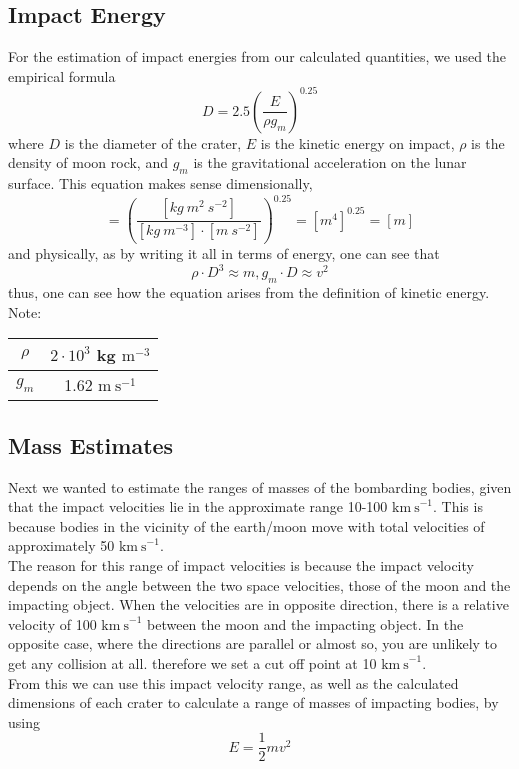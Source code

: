 \documentclass{article}
\begin{document}
\subsection{Impact Energy}
For the estimation of impact energies from our calculated quantities, we used the empirical formula
\begin{equation}
D=2.5\left(\frac{E}{\rho g_m}\right)^{0.25}
\label{eq: kinEdiamrel}
\end{equation}
where $D$ is the diameter of the crater, $E$ is the kinetic energy on impact, $\rho$ is the density of moon rock, and $g_m$ is the gravitational acceleration on the lunar surface. This equation makes sense dimensionally,
\begin{equation}
[m]=\left(\frac{[kg ~m^2 ~s^{-2}]}{[kg~ m^{-3}]\cdot [m ~s^{-2}]}\right)^{0.25}=[m^4]^{0.25}=[m]
\end{equation}
and physically, as by writing it all in terms of energy, one can see that
\begin{equation}
\rho \cdot D^3 \approx m, g_m\cdot D \approx v^2 
\end{equation}
thus, one can see how the equation arises from the definition of kinetic energy.\\
Note:\\
\begin{center}
\begin{tabular}{|c|c|}
\hline 
$\rho$ & $2\cdot 10^3$ kg $\mathrm{m}^{-3}$ \\ 
\hline 
$g_m$ & 1.62 $\mathrm{m~ s}^{-1}$ \\ 
\hline 
\end{tabular} 
\end{center}
\subsection{Mass Estimates}
\indent Next we wanted to estimate the ranges of masses of the bombarding bodies, given that the impact velocities lie in the approximate range 10-100 $\mathrm{km~s}^{-1}$. This is because bodies in the vicinity of the earth/moon move with total velocities of approximately 50 $\mathrm{km~s}^{-1}$.\\
\indent The reason for this range of impact velocities is because the impact velocity depends on the angle between the two space velocities, those of the moon and the impacting object. When the velocities are in opposite direction, there is a relative velocity of 100 $\mathrm{km~s}^{-1}$ between the moon and the impacting object. In the opposite case, where the directions are parallel or almost so, you are unlikely to get any collision at all. therefore we set a cut off point at 10 $\mathrm{km~s}^{-1}$.\\
\indent From this we can use this impact velocity range, as well as the calculated dimensions of each crater to calculate a range of masses of impacting  bodies, by using
\begin{equation}
E=\frac{1}{2}mv^2
\label{eq: kinE}
\end{equation}
\end{document}
